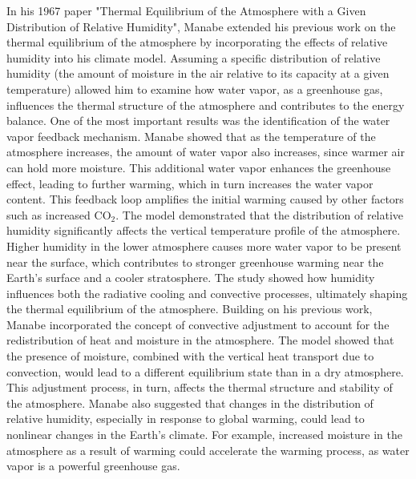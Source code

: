 In his 1967 paper "Thermal Equilibrium of the Atmosphere with a Given Distribution of Relative Humidity", Manabe extended his previous work on the thermal equilibrium of the atmosphere by incorporating the effects of relative humidity into his climate model. Assuming a specific distribution of relative humidity (the amount of moisture in the air relative to its capacity at a given temperature) allowed him to examine how water vapor, as a greenhouse gas, influences the thermal structure of the atmosphere and contributes to the energy balance. One of the most important results was the identification of the water vapor feedback mechanism. Manabe showed that as the temperature of the atmosphere increases, the amount of water vapor also increases, since warmer air can hold more moisture. This additional water vapor enhances the greenhouse effect, leading to further warming, which in turn increases the water vapor content. This feedback loop amplifies the initial warming caused by other factors such as increased CO$_2$. The model demonstrated that the distribution of relative humidity significantly affects the vertical temperature profile of the atmosphere. Higher humidity in the lower atmosphere causes more water vapor to be present near the surface, which contributes to stronger greenhouse warming near the Earth's surface and a cooler stratosphere. The study showed how humidity influences both the radiative cooling and convective processes, ultimately shaping the thermal equilibrium of the atmosphere. Building on his previous work, Manabe incorporated the concept of convective adjustment to account for the redistribution of heat and moisture in the atmosphere. The model showed that the presence of moisture, combined with the vertical heat transport due to convection, would lead to a different equilibrium state than in a dry atmosphere. This adjustment process, in turn, affects the thermal structure and stability of the atmosphere. Manabe also suggested that changes in the distribution of relative humidity, especially in response to global warming, could lead to nonlinear changes in the Earth’s climate. For example, increased moisture in the atmosphere as a result of warming could accelerate the warming process, as water vapor is a powerful greenhouse gas.